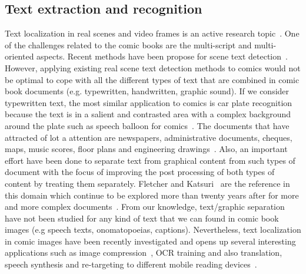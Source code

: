 



\subsection{Text extraction and recognition}
\label{sec:sota:text}


Text localization in real scenes and video frames is an active research topic~\cite{Jung04,ShahabICDAR2011Robust,KaratzasICDAR2013Robust}.
One of the challenges related to the comic books are the multi-script and multi-oriented aspects.
Recent methods have been propose for scene text detection~\cite{kasar2012multi,gomez2013multi}.
However, applying existing real scene text detection methods to comics would not be optimal to cope with all the different types of text that are combined in comic book documents (e.g. typewritten, handwritten, graphic sound).
If we consider typewritten text, the most similar application to comics is car plate recognition because the text is in a salient and contrasted area with a complex background around the plate such as speech balloon for comics~\cite{anagnostopoulos2008license}.
The documents that have attracted of lot a attention are newspapers, administrative documents, cheques, maps, music scores, floor plans and engineering drawings~\cite{nagy2000twenty}.
Also, an important effort have been done to separate text from graphical content from such types of document with the focus of improving the post processing of both types of content by treating them separately.
Fletcher and Katsuri~\cite{fletcher1988robust} are the reference in this domain which continue to be explored more than twenty years after for more and more complex documents~\cite{tombre2002text,Roy2007Text}.
From our knowledge, text/graphic separation have not been studied for any kind of text that we can found in comic book images (e.g speech texts, onomatopoeias, captions).
Nevertheless, text localization in comic images have been recently investigated and opens up several interesting applications such as image compression~\cite{Su11}, OCR training and also translation, speech synthesis and re-targeting to different mobile reading devices~\cite{Matsui2011}.

